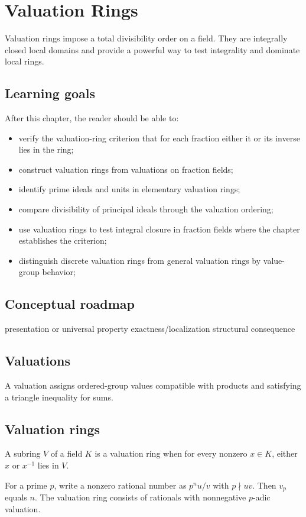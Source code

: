 \chapter{Valuation Rings}
\label{ch:v21}

Valuation rings impose a total divisibility order on a field. They are integrally closed local domains and provide a powerful way to test integrality and dominate local rings.

\section*{Learning goals}
After this chapter, the reader should be able to:
\begin{itemize}
\item verify the valuation-ring criterion that for each fraction either it or its inverse lies in the ring;
\item construct valuation rings from valuations on fraction fields;
\item identify prime ideals and units in elementary valuation rings;
\item compare divisibility of principal ideals through the valuation ordering;
\item use valuation rings to test integral closure in fraction fields where the chapter establishes the criterion;
\item distinguish discrete valuation rings from general valuation rings by value-group behavior;
\end{itemize}
\section*{Conceptual roadmap}
\volroadmap
  {presentation or universal property}
  {exactness/localization}
  {structural consequence}

\section{Valuations}
A valuation assigns ordered-group values compatible with products and satisfying a triangle inequality for sums.

\section{Valuation rings}
A subring $V$ of a field $K$ is a valuation ring when for every nonzero $x\in K$, either $x$ or $x^{-1}$ lies in $V$.

\begin{example}\label{ex:v21-expand-01}
For a prime $p$, write a nonzero rational number as $p^nu/v$ with $p\nmid uv$. Then $v_p$ equals $n$. The valuation ring consists of rationals with nonnegative $p$-adic valuation.
\end{example}
